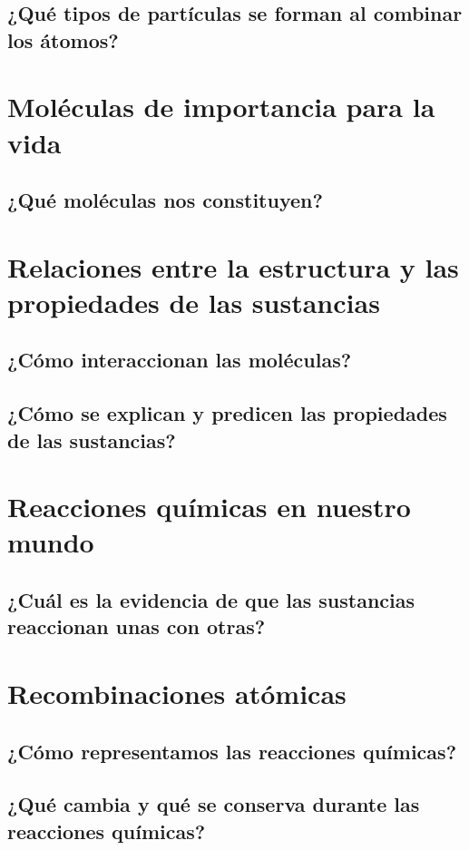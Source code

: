 \documentclass[11pt]{book}
\begin{document}
\subsection{¿Qué tipos de partículas se forman al combinar los átomos?}

\newpage
\section{Moléculas de importancia para la vida}
\subsection{¿Qué moléculas nos constituyen?}

\newpage
\section{Relaciones entre la estructura y las propiedades de las sustancias}
\subsection{¿Cómo interaccionan las moléculas?}
\subsection{¿Cómo se explican y predicen las propiedades de las sustancias?}

\newpage
\section{Reacciones químicas en nuestro mundo}
\subsection{¿Cuál es la evidencia de que las sustancias reaccionan unas con otras?}

\newpage
\section{Recombinaciones atómicas}
\subsection{¿Cómo representamos las reacciones químicas?}
\subsection{¿Qué cambia y qué se conserva durante las reacciones químicas?}
\end{document}

